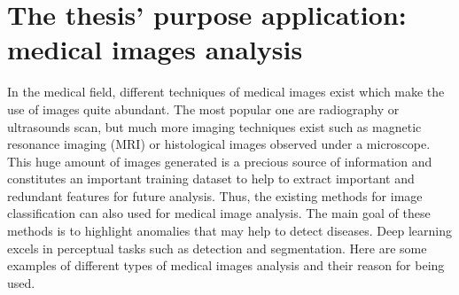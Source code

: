 \documentclass[11pt, openany]{report}
\theoremstyle{plain}
\theoremstyle{definition}
\theoremstyle{remark}
\begin{document}
\section{The thesis' purpose application: medical images analysis}
In the medical field, different techniques of medical images exist which make the use of images quite abundant. The most popular one are radiography or ultrasounds scan, but much more imaging techniques exist such as magnetic resonance imaging (MRI) or histological images observed under a microscope. This huge amount of images generated is a precious source of information and constitutes an important training dataset to help to extract important and redundant features for future analysis. Thus, the existing methods for image classification can also used for medical image analysis. The main goal of these methods is to highlight anomalies that may help to detect diseases. Deep learning excels in perceptual tasks such as detection and segmentation. Here are some examples of different types of medical images analysis and their reason for being used.
\end{document}
